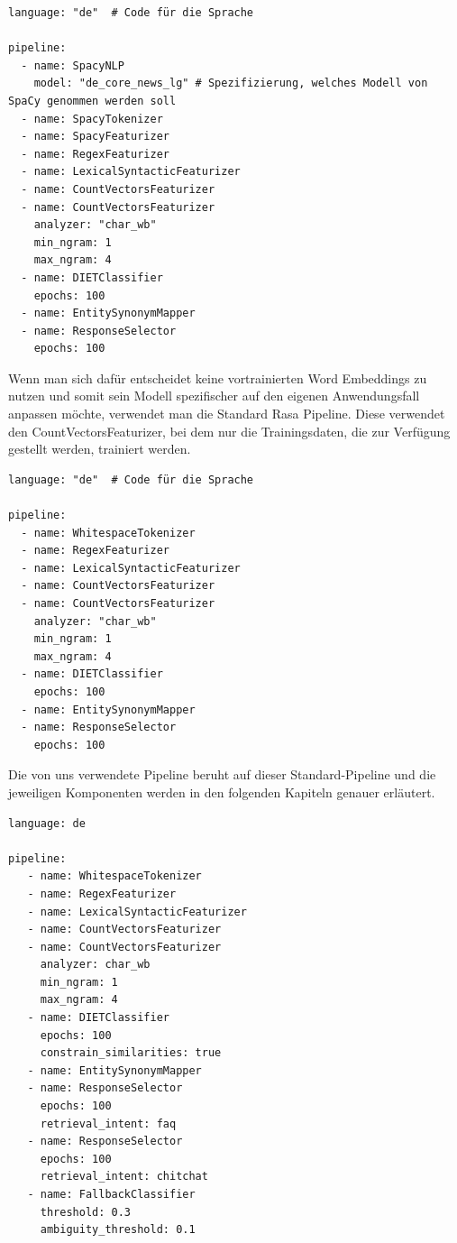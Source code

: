 \begin{lstlisting}[label={lst: Spacy Starting Pipeline}]
language: "de"  # Code für die Sprache

pipeline:
  - name: SpacyNLP
    model: "de_core_news_lg" # Spezifizierung, welches Modell von SpaCy genommen werden soll
  - name: SpacyTokenizer
  - name: SpacyFeaturizer
  - name: RegexFeaturizer
  - name: LexicalSyntacticFeaturizer
  - name: CountVectorsFeaturizer
  - name: CountVectorsFeaturizer
    analyzer: "char_wb"
    min_ngram: 1
    max_ngram: 4
  - name: DIETClassifier
    epochs: 100
  - name: EntitySynonymMapper
  - name: ResponseSelector
    epochs: 100

\end{lstlisting}

Wenn man sich dafür entscheidet keine vortrainierten Word Embeddings zu nutzen und somit sein Modell spezifischer auf den eigenen Anwendungsfall anpassen möchte, verwendet man die Standard Rasa Pipeline.
Diese verwendet den CountVectorsFeaturizer, bei dem nur die Trainingsdaten, die zur Verfügung gestellt werden, trainiert werden.\cite{startingPipelines, allComponents, nluExamples}

\begin{lstlisting}[label={lst: Default Starting Pipeline}]
language: "de"  # Code für die Sprache

pipeline:
  - name: WhitespaceTokenizer
  - name: RegexFeaturizer
  - name: LexicalSyntacticFeaturizer
  - name: CountVectorsFeaturizer
  - name: CountVectorsFeaturizer
    analyzer: "char_wb"
    min_ngram: 1
    max_ngram: 4
  - name: DIETClassifier
    epochs: 100
  - name: EntitySynonymMapper
  - name: ResponseSelector
    epochs: 100

\end{lstlisting}

Die von uns verwendete Pipeline beruht auf dieser Standard-Pipeline und die jeweiligen Komponenten werden in den folgenden Kapiteln genauer erläutert.

\begin{lstlisting}[label={lst: Our Pipeline}]
language: de

pipeline:
   - name: WhitespaceTokenizer
   - name: RegexFeaturizer
   - name: LexicalSyntacticFeaturizer
   - name: CountVectorsFeaturizer
   - name: CountVectorsFeaturizer
     analyzer: char_wb
     min_ngram: 1
     max_ngram: 4
   - name: DIETClassifier
     epochs: 100
     constrain_similarities: true
   - name: EntitySynonymMapper
   - name: ResponseSelector
     epochs: 100
     retrieval_intent: faq
   - name: ResponseSelector
     epochs: 100
     retrieval_intent: chitchat
   - name: FallbackClassifier
     threshold: 0.3
     ambiguity_threshold: 0.1
\end{lstlisting}

